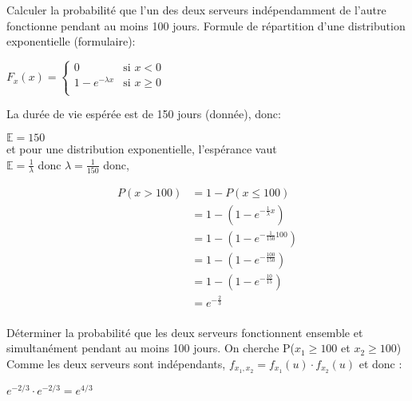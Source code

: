 
\begin{exo}
 
 \begin{subexo}{Calculer la probabilité que l’un des deux serveurs indépendamment de l’autre fonctionne pendant au moins 100 jours.}
 	Formule de répartition d'une distribution exponentielle (formulaire):
 		\begin{center}
 		$ F_x(x) =\begin{cases}
 		0 & \text{si $x < 0$} \\
 		1 - e^{-\lambda x} & \text{si $x \geq 0$} \\
 		\end{cases}$
 		\end{center}
 	La durée de vie espérée est de 150 jours (donnée), donc: 
 		\begin{center}
 			$\mathbb{E} = 150$ \\ 
 			et 	pour une distribution exponentielle, l'espérance vaut \\ 
 			$\mathbb{E} = \frac{1}{\lambda}$ donc $\lambda = \frac{1}{150}$ donc, 
 			
 			\begin{align*}
 			P(x > 100) &= 1 - P(x \le 100) \\
 			&= 1 - (1 - e^{-\frac{1}{\lambda}x})  \\
 			&= 1 - (1 - e^{-\frac{1}{150}100})  \\
 			&= 1 - (1 - e^{-\frac{100}{150}})  \\
 			&= 1 - (1 - e^{-\frac{10}{15}})  \\
 			&= e^{-\frac{2}{3}}  \\
 			\end{align*}
 		\end{center}
 \end{subexo}
  \begin{subexo}{Déterminer la probabilité que les deux serveurs fonctionnent ensemble et simultanément pendant au moins 100 jours.}
  	On cherche P($x_1 \geq 100$ et $x_2  \geq 100$) \\
  	Comme les deux serveurs sont indépendants, $f_{x_1,x_2} = f_{x_1}(u)\cdot f_{x_2}(u)$ et donc :\\
		\begin{center}
			$e^{-2/3} \cdot e^{-2/3} = e^{4/3}$
		\end{center}
  \end{subexo}
\end{exo}
